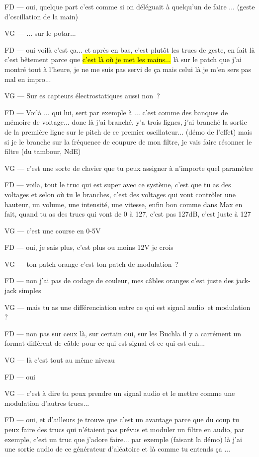 FD — oui, quelque part c'est comme si on déléguait à quelqu'un de faire ... (geste d'oscillation de la main) 

VG — ... sur le potar... 

FD — oui voilà c'est ça... et après en bas, c'est plutôt les trucs de geste, en fait là c'est bêtement parce que \hl{c'est là où je met les mains... } là sur le patch que j'ai montré tout à l'heure, je ne me suis pas servi de ça mais celui là je m'en sers pas mal en impro... 

VG — Sur es capteurs électrostatiques aussi non ? 

FD — Voilà ... qui lui, sert par exemple à ... c'est comme des banques de mémoire de voltage... donc là j'ai branché, y'a trois lignes, j'ai branché la sortie de la première ligne sur le pitch de ce premier oscillateur... (démo de l'effet) mais si je le branche sur la fréquence de coupure de mon filtre, je vais faire résonner le filtre (du tambour, NdE) 

VG — c'est une sorte de clavier que tu peux assigner à n'importe quel paramètre 

FD — voila, tout le truc qui est super avec ce système, c'est que tu as des voltages et selon où tu le branches, c'est des voltages qui vont contrôler une hauteur, un volume, une intensité, une vitesse, enfin bon comme dans Max en fait, quand tu as des trucs qui vont de 0 à 127, c'est pas 127dB, c'est juste à 127  

VG — c'est une course en 0-5V 

FD — oui, je sais plus, c'est plus ou moins 12V je crois 

VG — ton patch orange c'est ton patch de modulation ? 

FD — non j'ai pas de codage de couleur, mes câbles oranges c'est juste des jack-jack simples 

VG — mais tu as une différenciation entre ce qui est signal audio et modulation ? 

FD — non pas sur ceux là, sur certain oui, sur les Buchla il y a carrément un format différent de câble pour ce qui est signal et ce qui est euh... 

VG — là c'est tout au même niveau 

FD — oui 

VG — c'est à dire tu peux prendre un signal audio et le mettre comme une modulation d'autres trucs... 

FD — oui, et d'ailleurs je trouve que c'est un avantage parce que du coup tu peux faire des trucs qui n'étaient pas prévus et moduler un filtre en audio, par exemple, c'est un truc que j'adore faire... par exemple (faisant la démo) là j'ai une sortie audio de ce générateur d'aléatoire et là comme tu entends ça ... 

